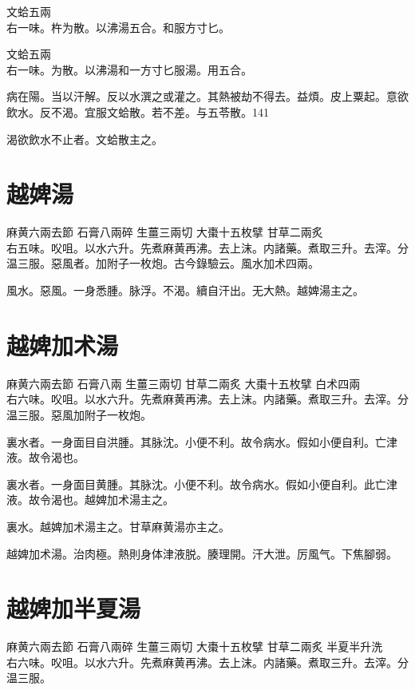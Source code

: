 文蛤{\scriptsize 五兩}\\
右一味。杵为散。以沸湯五合。和服方寸匕。{\dengben}

文蛤{\scriptsize 五兩}\\
右一味。为散。以沸湯和一方寸匕服湯。用五合。{\zhaoben}

病在陽。当以汗解。反以水潠之或灌之。其熱被劫不得去。益煩。皮上粟起。意欲飲水。反不渴。宜服文蛤散。若不差。与五苓散。141

渴欲飲水不止者。文蛤散主之。

\section{越婢湯}

麻黄{\scriptsize 六兩去節} 石膏{\scriptsize 八兩碎} 生薑{\scriptsize 三兩切} 大棗{\scriptsize 十五枚擘} 甘草{\scriptsize 二兩炙}\\
右五味。㕮咀。以水六升。先煮麻黄{\khaaitp 再沸}。去上沫。内諸藥。煮取三升。去滓。分温三服。惡風者。加附子一枚炮。{\scriptsize 古今錄驗云。風水加术四兩。}

風水。惡風。一身悉腫。脉浮。不渴。續自汗出。无大熱。越婢湯主之。

\section{越婢加术湯}

麻黄{\scriptsize 六兩去節} 石膏{\scriptsize 八兩} 生薑{\scriptsize 三兩切} 甘草{\scriptsize 二兩炙} 大棗{\scriptsize 十五枚擘} 白术{\scriptsize 四兩}\\
右六味。㕮咀。以水六升。先煮麻黄再沸。去上沫。内諸藥。煮取三升。去滓。分温三服。惡風加附子一枚炮。

裏水者。一身面目自洪腫。其脉沈。小便不利。故令病水。假如小便自利。亡津液。故令渴也。{\wuben}

裏水者。一身面目黄腫。其脉沈。小便不利。故令病水。假如小便自利。此亡津液。故令渴也。越婢加术湯主之。{\dengben}

裏水。越婢加术湯主之。甘草麻黄湯亦主之。

越婢加术湯。治肉極。熱則身体津{\khaaitp 液}脱。腠理開。汗大泄。厉風气。下焦腳弱。

\section{越婢加半夏湯}

麻黄{\scriptsize 六兩去節} 石膏{\scriptsize 八兩碎} 生薑{\scriptsize 三兩切} 大棗{\scriptsize 十五枚擘} 甘草{\scriptsize 二兩炙} 半夏{\scriptsize 半升洗}\\
右六味。㕮咀。以水六升。先煮麻黄再沸。去上沫。内諸藥。煮取三升。去滓。分温三服。

